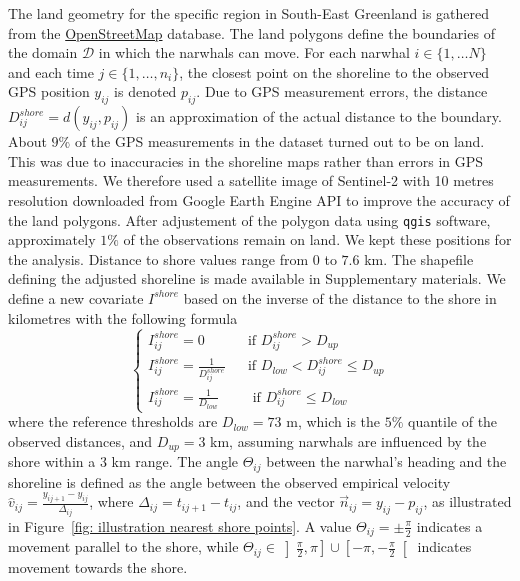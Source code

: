 \documentclass[aoas]{imsart}
\theoremstyle{definition}
\theoremstyle{remark}
\theoremstyle{remark}
\newcommand {\1}{\mathbb{1}}
\begin{document}
The land geometry for the specific region in South-East Greenland is gathered from the \href{https://www.openstreetmap.org/#map=11/70.4029/-27.2928}{OpenStreetMap} database. The land polygons define the boundaries of the domain $\mathcal{D}$ in which the narwhals can move. For each narwhal $i\in\{1, \ldots N\}$ and each time $j\in\{1, \ldots, n_i\}$, the closest point on the shoreline to the observed GPS position $y_{ij}$  is denoted $p_{ij}$. Due to GPS measurement errors, the distance $D^{shore}_{ij}=d(y_{ij},p_{ij})$ is an approximation of the actual distance to the boundary. About $9\%$ of the GPS measurements in the dataset turned out to be on land. This was due  to inaccuracies in the shoreline maps rather than errors in GPS measurements. We therefore used a satellite image of Sentinel-2 with 10 metres resolution downloaded from Google Earth Engine API to improve the accuracy of the land polygons. After adjustement of the polygon data using \texttt{qgis} software,  approximately $1 \%$ of the observations remain on land. We kept these positions for the analysis. Distance to shore values range from $0$ to $7.6$ km. The shapefile defining the adjusted shoreline is made available in Supplementary materials. We define a new covariate $I^{shore}$ based on the inverse of the distance to the shore in kilometres with the following formula
\begin{equation}
	\left\{
	\begin{array}{lll}
		I^{shore}_{ij}=0 && \mbox{if } D^{shore}_{ij}>D_{up} \\
		I^{shore}_{ij}=\frac{1}{D^{shore}_{ij}} && \mbox{if } D_{low}<D^{shore}_{ij} \leq D_{up} \\
		I^{shore}_{ij}=\frac{1}{D_{low}} && \mbox{ if } D^{shore}_{ij} \leq D_{low}
	\end{array}
	\right.
	\label{eq: exp shore definition}
\end{equation}
where the reference thresholds are $D_{low}=73$ m, which is the $5\%$ quantile of the observed distances, and $D_{up}=3$ km, assuming narwhals are influenced by the shore within a $3$ km range. 
The angle $\Theta_{ij}$ between the narwhal's heading and the shoreline is defined as the angle between the observed empirical velocity $\hat{v}_{ij}=\frac{y_{ij+1}-y_{ij}}{\Delta_{ij}}$, where $\Delta_{ij}=t_{ij+1}-t_{ij}$, and the vector $\vec{n}_{ij}=y_{ij}-p_{ij}$, as illustrated in Figure~\ref{fig: illustration nearest shore points}. A value $\Theta_{ij}=\pm \frac{\pi}{2}$ indicates a movement parallel to the shore, while $\Theta_{ij} \in \left]\frac{\pi}{2},\pi\right] \cup \left[-\pi,-\frac{\pi}{2}\right[$ indicates movement towards the shore. 
\end{document}
